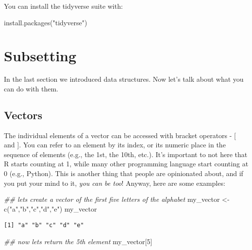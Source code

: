 \documentclass[
  letterpaper,
  DIV=11,
  numbers=noendperiod]{scrreprt}
\newenvironment{Shaded}{\begin{snugshade}}{\end{snugshade}}
\newcommand{\DecValTok}[1]{\textcolor[rgb]{0.68,0.00,0.00}{#1}}
\newcommand{\DocumentationTok}[1]{\textcolor[rgb]{0.37,0.37,0.37}{\textit{#1}}}
\newcommand{\FunctionTok}[1]{\textcolor[rgb]{0.28,0.35,0.67}{#1}}
\newcommand{\NormalTok}[1]{\textcolor[rgb]{0.00,0.23,0.31}{#1}}
\newcommand{\OtherTok}[1]{\textcolor[rgb]{0.00,0.23,0.31}{#1}}
\newcommand{\StringTok}[1]{\textcolor[rgb]{0.13,0.47,0.30}{#1}}
\begin{document}
You can install the tidyverse suite with:

\begin{Shaded}
\begin{Highlighting}[]
\FunctionTok{install.packages}\NormalTok{(}\StringTok{"tidyverse"}\NormalTok{)}
\end{Highlighting}
\end{Shaded}

\section{Subsetting}\label{subsetting}

In the last section we introduced data structures. Now let's talk about
what you can do with them.

\subsection{Vectors}\label{vectors}

The individual elements of a vector can be accessed with bracket
operators - {[} and {]}. You can refer to an element by its index, or
its numeric place in the sequence of elements (e.g., the 1st, the 10th,
etc.). It's important to not here that R starts counting at 1, while
many other programming language start counting at 0 (e.g., Python). This
is another thing that people are opinionated about, and if you put your
mind to it, \emph{you can be too}! Anyway, here are some examples:

\begin{Shaded}
\begin{Highlighting}[]
\DocumentationTok{\#\# let\textquotesingle{}s create a vector of the first five letters of the alphabet}
\NormalTok{my\_vector }\OtherTok{\textless{}{-}} \FunctionTok{c}\NormalTok{(}\StringTok{"a"}\NormalTok{,}\StringTok{"b"}\NormalTok{,}\StringTok{"c"}\NormalTok{,}\StringTok{"d"}\NormalTok{,}\StringTok{"e"}\NormalTok{)}
\NormalTok{my\_vector}
\end{Highlighting}
\end{Shaded}

\begin{verbatim}
[1] "a" "b" "c" "d" "e"
\end{verbatim}

\begin{Shaded}
\begin{Highlighting}[]
\DocumentationTok{\#\# now let\textquotesingle{}s return the 5th element}
\NormalTok{my\_vector[}\DecValTok{5}\NormalTok{]}
\end{Highlighting}
\end{Shaded}
\end{document}
